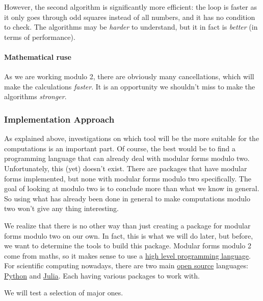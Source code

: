 However, the second algorithm is significantly more efficient: the loop is faster as it only goes through odd squares instead of all numbers, and it has no condition to check.
The algorithms may be \textit{harder} to understand, but it in fact is \textit{better} (in terms of performance).

\paragraph{Mathematical ruse}
As we are working modulo 2, there are obviously many cancellations, which will make the calculations \textit{faster}.
It is an opportunity we shouldn't miss to make the algorithms \textit{stronger}.



\subsubsection{Implementation Approach}
As explained above, investigations on which tool will be the more suitable for the computations is an important part.
Of course, the best would be to find a programming language that can already deal with modular forms modulo two.
Unfortunately, this (yet) doesn't exist.
There are packages that have modular forms implemented, but none with modular forms modulo two specifically.
The goal of looking at modulo two is to conclude more than what we know in general.
So using what has already been done in general to make computations modulo two won't give any thing interesting.

We realize that there is no other way than just creating a package for modular forms modulo two on our own.
In fact, this is what we will do later, but before, we want to determine the tools to build this package.
Modular forms modulo 2 come from maths, so it makes sense to use a \href{https://en.wikipedia.org/wiki/High-level_programming_language}{high level programming language}.
For scientific computing nowadays, there are two main \href{https://en.wikipedia.org/wiki/Open-source_model}{open source} languages: \href{https://en.wikipedia.org/wiki/Python_(programming_language)}{Python} and \href{https://en.wikipedia.org/wiki/Julia_(programming_language)}{Julia}.
Each having various packages to work with.

We will test a selection of major ones.



